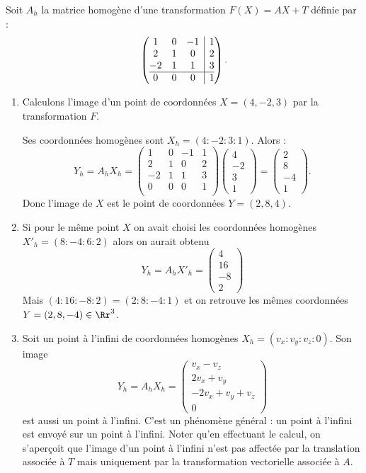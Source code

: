 \documentclass[11pt,class=report,crop=false]{standalone}
\begin{document}
\begin{exemple}
Soit $A_h$ la matrice homogène d'une transformation $F(X)=AX+T$ définie par  :
$$
 \left(\begin{array}{@{}ccc|c@{}}
	1  & 0 & -1 & 1 \\
	2  & 1 & 0  & 2 \\
	-2 & 1 & 1  & 3 \\\hline
	0  & 0 & 0  & 1 \\
\end{array}\right).
$$

\begin{enumerate}
	\item Calculons l'image d'un point de coordonnées $X = (4,-2,3)$ par la transformation $F$.

    Ses coordonnées homogènes sont  $X_h= (4:-2:3:1)$.
    Alors :
    $$Y_h = A_h X_h 
    = \begin{pmatrix}
	1  & 0 & -1 & 1 \\
    2  & 1 & 0  & 2 \\
    -2 & 1 & 1  & 3 \\
    0  & 0 & 0  & 1 \\    
    \end{pmatrix}
     \begin{pmatrix}4\\-2\\3\\1\end{pmatrix}
    = \begin{pmatrix}2\\8\\-4\\1\end{pmatrix}.$$
    Donc l'image de $X$ est le point de coordonnées $Y = (2,8,4)$.
    
    \item Si pour le même point $X$ on avait choisi les coordonnées homogènes 
    $X'_h= (8:-4:6:2)$ alors on aurait obtenu
    $$Y_h = A_h X'_h = \begin{pmatrix}4\\16\\-8\\2\end{pmatrix}$$
    Mais $(4:16:-8:2)=(2:8:-4:1)$ et on retrouve les mêmes coordonnées $Y =(2,8,-4) \in \Rr^3$.
    
    \item Soit un point à l'infini de coordonnées homogènes $X_h =  (v_x:v_y:v_z:0)$.
    Son image  
    $$Y_h = A_h X_h = \left(\begin{smallmatrix}v_x-v_z\\2v_x+v_y\\-2v_x+v_y+v_z\\0\end{smallmatrix}\right)$$
    est aussi un point à l'infini. C'est un phénomène général : un point à l'infini est envoyé sur un point à l'infini. Noter qu'en effectuant le calcul, on s'aperçoit que l'image d'un point à l'infini n'est pas affectée par la translation associée à $T$ mais uniquement par la transformation vectorielle associée à $A$.
 \end{enumerate}   
	

\end{exemple}
\end{document}
